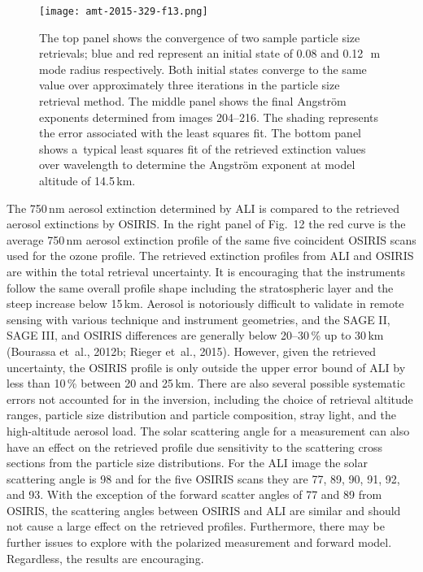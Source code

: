 \documentclass[amt]{copernicus}
\begin{document}
\begin{figure}[t]
\texttt{[image: amt-2015-329-f13.png]}
\caption{The top panel shows the convergence of two sample particle
  size retrievals; blue and red represent an initial state of 0.08 and
  0.12\,\unit{{\mu}m} mode radius respectively. Both initial states
  converge to the same value over approximately three iterations in the
  particle size retrieval method. The middle panel shows the final
  Angstr\"{o}m exponents determined from images 204--216. The shading
  represents the error associated with the least squares fit. The
  bottom panel shows a~typical least squares fit of the retrieved
  extinction values over wavelength to determine the Angstr\"{o}m
  exponent at model altitude of 14.5\,\unit{km}.}
\end{figure}

The 750\,\unit{nm} aerosol extinction determined by ALI is compared to the retrieved aerosol extinctions by OSIRIS.
In the right panel of Fig.~12 the red curve is the average 750\,\unit{nm} aerosol extinction profile of the
same five coincident OSIRIS scans used for the ozone profile. The
retrieved extinction profiles from ALI and OSIRIS are within the
total retrieval uncertainty. It is encouraging that the instruments follow the same overall profile shape
including the stratospheric layer and the steep increase below
15\,\unit{km}. Aerosol is notoriously
difficult to validate in remote sensing with various technique and
instrument geometries, and the SAGE II, SAGE III, and OSIRIS
differences are generally below 20--30\,{\%} up to 30\,\unit{km}
(Bourassa et~al., 2012b; Rieger et~al., 2015). However, given the retrieved uncertainty, the OSIRIS profile
is only outside the upper error bound of ALI by less than
10\,{\%} between 20 and 25\,\unit{km}. There are also several possible systematic errors not
accounted for in the inversion, including the choice of retrieval
altitude ranges, particle size distribution and  particle composition, stray
light, and the high-altitude aerosol load. The solar scattering angle for a measurement can
also have an effect on the retrieved profile due sensitivity to the scattering cross sections from
the particle size distributions. For the ALI image the solar scattering angle is 98{\degree} and for the five OSIRIS scans
they are 77, 89, 90, 91, 92, and 93{\degree}. With the exception of the forward scatter angles of 77 and 89{\degree} from OSIRIS,
the scattering angles between OSIRIS and ALI are similar and should not cause a large effect on the retrieved profiles. Furthermore, there may be
further issues to explore with the polarized measurement and forward
model. Regardless, the results are encouraging.
\end{document}
